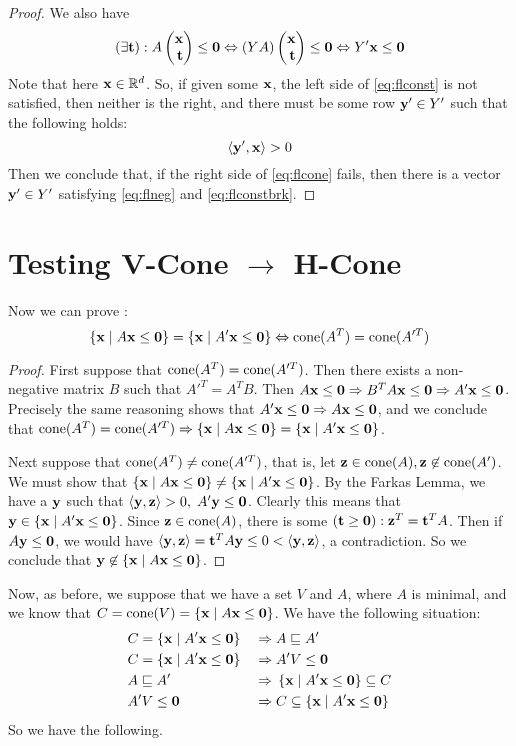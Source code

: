 \begin{proof}
	We also have
	\begin{equation}\label{eq:flconst}
		(\exists \t) : A \xt \leq \0 \Leftrightarrow
		(YA)\xt \leq \0 \Leftrightarrow
		Y'\x \leq \0
	\end{equation}
	Note that here $\x \in \R^d$.  So, if given some $\x$, the left side of \eqref{eq:flconst} is not satisfied, then neither is the right, and there must be some row $\y' \in Y'$ such that the following holds:
	\begin{equation}\label{eq:flconstbrk} \ip{\y'}{\x} > 0 \end{equation}
	Then we conclude that, if the right side of \eqref{eq:flcone} fails, then there is a vector $\y' \in Y'$ satisfying \eqref{eq:flneg} and \eqref{eq:flconstbrk}.
\end{proof}

\section{Testing V-Cone $\to$ H-Cone}

Now we can prove :
\[ \HC{A} = \HC{A'} \Leftrightarrow \cone(A^T) = \cone(A'^T) \]

\begin{proof}
	First suppose that $\cone(A^T) = \cone(A'^T)$.  Then there exists a non-negative matrix $B$ such that $A'^T = A^TB$.  Then $A\x \leq \0 \Rightarrow B^TA\x\leq \0 \Rightarrow A'\x\leq\0$.  Precisely the same reasoning shows that $A'\x\leq\0 \Rightarrow A\x\leq\0$, and we conclude that $\cone(A^T) = \cone(A'^T) \Rightarrow \HC{A} = \HC{A'}$.

	Next suppose that $\cone(A^T) \neq \cone(A'^T)$, that is, let $\z \in \cone(A), \z \not\in\cone(A')$.  We must show that $\HC{A} \neq \HC{A'}$.  By the Farkas Lemma, we have a $\y$ such that $\ip{\y}{\z} > 0,\; A'\y \leq \0$.  Clearly this means that $\y \in \HC{A'}$.  Since $\z \in \cone(A)$, there is some $(\t \geq \0): \z^T = \t^T A$.  Then if $A\y\leq\0$, we would have $\ip{\y}{\z} = \t^T A\y \leq 0 < \ip{\y}{\z}$, a contradiction.  So we conclude that $\y\not\in\HC{A}$.
\end{proof}

Now, as before, we suppose that we have a set $V$ and $A$, where $A$ is minimal, and we know that $C = \cone(V) = \HC{A}$.  We have the following situation:
\begin{alignat*}{2}
	 & C = \HC{A'}    \;   & \Rightarrow & \; A \sqsubseteq A'    \\
	 & C = \HC{A'}    \;   & \Rightarrow & \; A'V\leq\0           \\
	 & A \sqsubseteq A' \; & \Rightarrow & \; \HC{A'} \subseteq C \\
	 & A'V\leq\0  \;       & \Rightarrow & \; C \subseteq \HC{A'}
\end{alignat*}
So we have the following.

